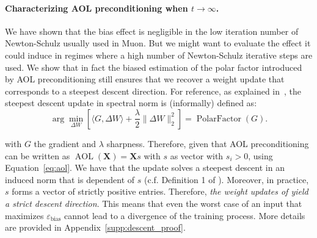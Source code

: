 \paragraph{Characterizing AOL preconditioning when $t \rightarrow \infty$.}
We have shown that the bias effect is negligible in the low iteration number of Newton-Schulz usually used in Muon. But we might want to evaluate the effect it could induce in regimes where a high number of Newton-Schulz iterative steps are used. We show that in fact the biased estimation of the polar factor introduced by AOL preconditioning still ensures that we recover a weight update that corresponds to a steepest descent direction. For reference, as explained in~\cite{bernstein2024oldoptimizernewnorm}, 
the steepest descent update in spectral norm is (informally) defined as:
\vspace{1mm}
\begin{equation}
    \arg \min_{\Delta W} \left[ \langle G, \Delta W \rangle + \frac{\lambda}{2} \| \Delta W \|_2^2 \right] = \operatorname{PolarFactor}(G).
\label{eq:spectral_descent}
\end{equation}
\vspace{1mm}

\noindent with $G$ the gradient and $\lambda$ sharpness. Therefore, given that AOL preconditioning can be written as $\operatorname{AOL}(\mathbf{X}) = \mathbf{X}s$ with $s$ as vector with $s_i > 0$,  using Equation~\ref{eq:aol}. We have that the \turbomuon update solves a steepest descent in an induced norm that is dependent of $s$ (c.f. Definition 1 of \citet{bernstein2024oldoptimizernewnorm}).
Moreover, in practice, $s$ forms a vector of strictly positive entries. Therefore, \textit{the weight updates of \turbomuon yield a strict descent direction}. This means that even the worst case of an input that maximizes $\varepsilon_{\text{bias}}$ cannot lead to a divergence of the training process. More details are provided in Appendix~\ref{supp:descent_proof}.


